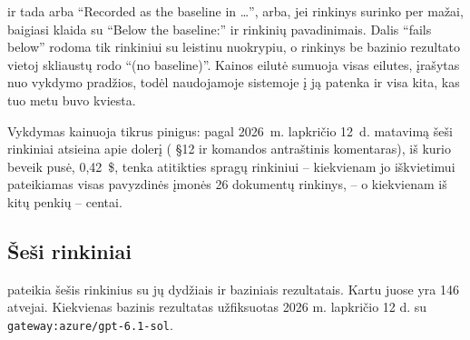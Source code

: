 \noindent ir tada arba \enquote{Recorded as the baseline in \ldots}, arba, jei rinkinys
surinko per mažai, baigiasi klaida su \enquote{Below the baseline:} ir rinkinių pavadinimais.
Dalis \enquote{fails below} rodoma tik rinkiniui su leistinu nuokrypiu, o rinkinys be bazinio
rezultato vietoj skliaustų rodo \enquote{(no baseline)}. Kainos eilutė sumuoja visas
 eilutes, įrašytas nuo vykdymo pradžios, todėl naudojamoje sistemoje į ją
patenka ir visa kita, kas tuo metu buvo kviesta.

Vykdymas kainuoja tikrus pinigus: pagal 2026~m. lapkričio 12~d. matavimą šeši rinkiniai
atsieina apie dolerį ( §12 ir komandos antraštinis komentaras),
iš kurio beveik pusė, 0,42~\$, tenka atitikties spragų rinkiniui --
kiekvienam jo iškvietimui pateikiamas visas pavyzdinės įmonės 26 dokumentų rinkinys, -- o
kiekvienam iš kitų penkių -- centai.

\subsection{Šeši rinkiniai}\label{sec:control:suites}

 pateikia šešis rinkinius su jų dydžiais ir baziniais rezultatais.
Kartu juose yra 146 atvejai. Kiekvienas bazinis rezultatas užfiksuotas 2026 m. lapkričio 12 d.
su \texttt{gateway:azure/gpt-6.1-sol}.

